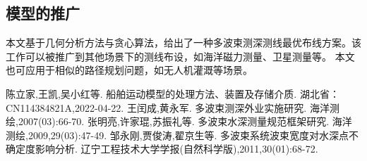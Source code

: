 \documentclass[withoutpreface,bwprint]{cumcmthesis} %
\begin{document}
        \subsection{模型的推广}
        本文基于几何分析方法与贪心算法，给出了一种多波束测深测线最优布线方案。该工作可以被推广到其他场景下的测线布设，如海洋磁力测量、卫星测量等。
        本文也可应用于相似的路径规划问题，如无人机灌溉等场景。
        \begin{thebibliography}{9}%
            陈立家,王凯,吴小红等.
            \newblock 船舶运动模型的处理方法、装置及存储介质\allowbreak[P].
            \newblock 湖北省：CN114384821A,2022-04-22.
            王闰成,黄永军.
            \newblock 多波束测深外业实施研究\allowbreak[J].
            \newblock 海洋测绘,2007(03):66-70.
            张明亮,许家琨,苏振礼等.
            \newblock 多波束水深测量规范框架研究\allowbreak[J].
            \newblock 海洋测绘,2009,29(03):47-49.
            邹永刚,贾俊涛,翟京生等.
            \newblock 多波束系统波束宽度对水深点不确定度影响分析\allowbreak[J].
            \newblock 辽宁工程技术大学学报(自然科学版),2011,30(01):68-72.
        \end{thebibliography}
        \newpage
\end{document}
